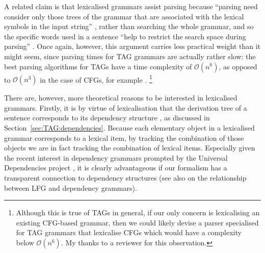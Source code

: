 \documentclass[output=paper,hidelinks]{langscibook}
\begin{document}
A related claim is that lexicalised grammars assist parsing because ``parsing
need consider only those trees of the grammar that are associated with the
lexical symbols in the input string'' \citep[79f.]{eisner:parsing}, rather
than searching the whole grammar, and so the specific words used in a sentence
``help to restrict the search space during parsing'' \citep[20]{Kallmeyer2010}.
Once again, however, this argument carries less practical weight than it might
seem, since parsing times for TAG grammars are actually rather slow: the best
parsing algorithms for TAGs have a time complexity of $\mathcal{O}(n^6)$, as
opposed to $\mathcal{O}(n^3)$ in the case of CFGs, for example
\citep[ch.~5]{Kallmeyer2010}.%
%
\footnote{Although this is true of TAGs in general, if our only concern is
  lexicalising an existing CFG-based grammar, then we could likely devise a
  parser specialised for TAG grammars that lexicalise CFGs which would have a
  complexity below $\mathcal{O}(n^{6})$. My thanks to a reviewer for this
  observation.}
%

There are, however, more theoretical reasons to be interested in lexicalised
grammars. Firstly, it is by virtue of lexicalisation that the derivation tree of
a sentence corresponds to its dependency structure \citep[4ff.]{Kuhlmann2010},
as discussed in Section~\ref{sec:TAG:dependencies}. Because each elementary object
in a lexicalised grammar corresponds to a lexical item, by tracking the
combination of those objects we are in fact tracking the combination of lexical
items. Especially given the recent interest in dependency grammars prompted by
the Universal Dependencies project \citep{UD}, it is clearly advantageous if our
formalism has a transparent connection to dependency structures (see also
 on the relationship between LFG and dependency
grammars).
\end{document}
